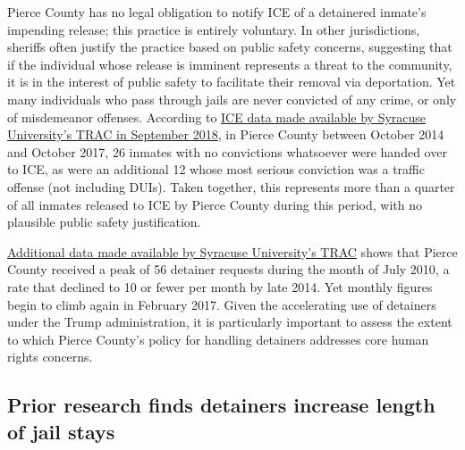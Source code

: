 \documentclass[12pt]{report}\usepackage[]{graphicx}\usepackage[]{color}
\begin{document}
Pierce County has no legal obligation to notify ICE of a detainered inmate's impending release; this practice is entirely voluntary. In other jurisdictions, sheriffs often justify the practice based on public safety concerns, suggesting that if the individual whose release is imminent represents a threat to the community, it is in the interest of public safety to facilitate their removal via deportation. Yet many individuals who pass through jails are never convicted of any crime, or only of misdemeanor offenses. According to \href{http://trac.syr.edu/phptools/immigration/apprehend/}{ICE data made available by Syracuse University's TRAC in September 2018}, in Pierce County between October 2014 and October 2017, 26 inmates with no convictions whatsoever were handed over to ICE, as were an additional 12 whose most serious conviction was a traffic offense (not including DUIs). Taken together, this represents more than a quarter of all inmates released to ICE by Pierce County during this period, with no plausible public safety justification.

\href{http://trac.syr.edu/phptools/immigration/detain/}{Additional data made available by Syracuse University's TRAC} shows that Pierce County received a peak of 56 detainer requests during the month of July 2010, a rate that declined to 10 or fewer per month by late 2014. Yet monthly figures begin to climb again in February 2017. Given the accelerating use of detainers under the Trump administration, it is particularly important to assess the extent to which Pierce County's policy for handling detainers addresses core human rights concerns.

\subsection*{Prior research finds detainers increase length of jail stays}
\end{document}
